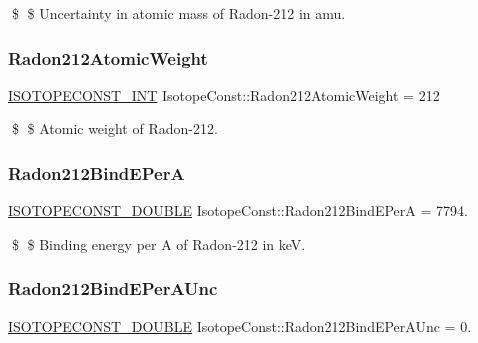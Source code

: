 \$ \$ Uncertainty in atomic mass of Radon-\/212 in amu. \mbox{\label{group___isotope_const-_radon-_rn212_ga380561c7edd25cd1b608864b1791a07d}} 
\subsubsection{\texorpdfstring{Radon212\+Atomic\+Weight}{Radon212AtomicWeight}}
{\footnotesize\ttfamily \mbox{\hyperlink{group___isotope_const-_macros_ga5f18360b3e99483a35c32d789e62621c}{I\+S\+O\+T\+O\+P\+E\+C\+O\+N\+S\+T\+\_\+\+I\+NT}} Isotope\+Const\+::\+Radon212\+Atomic\+Weight = 212}

\$ \$ Atomic weight of Radon-\/212. \mbox{\label{group___isotope_const-_radon-_rn212_ga2285d492092ede030d7979dd220a3857}} 
\subsubsection{\texorpdfstring{Radon212\+Bind\+E\+PerA}{Radon212BindEPerA}}
{\footnotesize\ttfamily \mbox{\hyperlink{group___isotope_const-_macros_ga8f45a7272ce02c0b4c65c44636ed719a}{I\+S\+O\+T\+O\+P\+E\+C\+O\+N\+S\+T\+\_\+\+D\+O\+U\+B\+LE}} Isotope\+Const\+::\+Radon212\+Bind\+E\+PerA = 7794.}

\$ \$ Binding energy per A of Radon-\/212 in keV. \mbox{\label{group___isotope_const-_radon-_rn212_gad98e7a1075f2980917b0449e4e43c15d}} 
\subsubsection{\texorpdfstring{Radon212\+Bind\+E\+Per\+A\+Unc}{Radon212BindEPerAUnc}}
{\footnotesize\ttfamily \mbox{\hyperlink{group___isotope_const-_macros_ga8f45a7272ce02c0b4c65c44636ed719a}{I\+S\+O\+T\+O\+P\+E\+C\+O\+N\+S\+T\+\_\+\+D\+O\+U\+B\+LE}} Isotope\+Const\+::\+Radon212\+Bind\+E\+Per\+A\+Unc = 0.}

